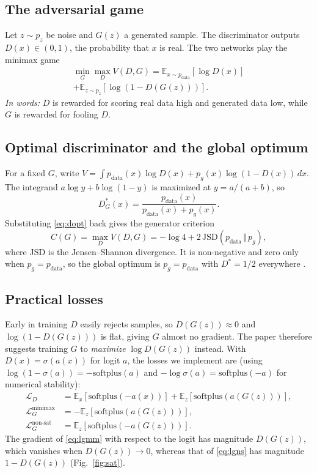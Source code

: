 \documentclass[conference]{IEEEtran}
\newcommand{\E}{\mathbb{E}}
\newcommand{\pdata}{p_{\mathrm{data}}}
\begin{document}
\subsection{The adversarial game}
Let $z\sim p_z$ be noise and $G(z)$ a generated sample. The discriminator outputs $D(x)\in(0,1)$, the probability that $x$ is real. The two networks play the minimax game
\begin{multline}
\min_G\max_D V(D,G)=\E_{x\sim\pdata}[\log D(x)]\\
+\E_{z\sim p_z}[\log(1-D(G(z)))].
\label{eq:value}
\end{multline}
\emph{In words:} $D$ is rewarded for scoring real data high and generated data low, while $G$ is rewarded for fooling $D$.

\subsection{Optimal discriminator and the global optimum}
For a fixed $G$, write $V=\int \pdata(x)\log D(x)+p_g(x)\log(1-D(x))\,dx$. The integrand $a\log y+b\log(1-y)$ is maximized at $y=a/(a+b)$, so
\begin{equation}
D^*_G(x)=\frac{\pdata(x)}{\pdata(x)+p_g(x)}.
\label{eq:dopt}
\end{equation}
Substituting \eqref{eq:dopt} back gives the generator criterion
\begin{equation}
C(G)=\max_D V(D,G)=-\log 4+2\,\mathrm{JSD}(\pdata\,\Vert\,p_g),
\label{eq:jsd}
\end{equation}
where JSD is the Jensen--Shannon divergence. It is non-negative and zero only when $p_g=\pdata$, so the global optimum is $p_g=\pdata$ with $D^*=1/2$ everywhere \cite{goodfellow2014gan}.

\subsection{Practical losses}
Early in training $D$ easily rejects samples, so $D(G(z))\approx 0$ and $\log(1-D(G(z)))$ is flat, giving $G$ almost no gradient. The paper therefore suggests training $G$ to \emph{maximize} $\log D(G(z))$ instead. With $D(x)=\sigma(a(x))$ for logit $a$, the losses we implement are (using $\log(1-\sigma(a))=-\mathrm{softplus}(a)$ and $-\log\sigma(a)=\mathrm{softplus}(-a)$ for numerical stability):
\begin{align}
\mathcal{L}_D&=\E_{x}[\mathrm{softplus}(-a(x))]+\E_{z}[\mathrm{softplus}(a(G(z)))],\label{eq:ld}\\
\mathcal{L}_G^{\mathrm{minimax}}&=-\E_{z}[\mathrm{softplus}(a(G(z)))],\label{eq:lgmm}\\
\mathcal{L}_G^{\mathrm{non\text{-}sat}}&=\E_{z}[\mathrm{softplus}(-a(G(z)))].\label{eq:lgns}
\end{align}
The gradient of \eqref{eq:lgmm} with respect to the logit has magnitude $D(G(z))$, which vanishes when $D(G(z))\to 0$, whereas that of \eqref{eq:lgns} has magnitude $1-D(G(z))$ (Fig.~\ref{fig:sat}).
\end{document}
